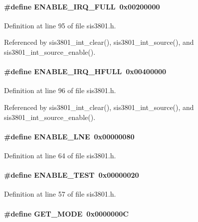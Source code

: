 \paragraph[{ENABLE\_\-IRQ\_\-FULL}]{\setlength{\rightskip}{0pt plus 5cm}\#define ENABLE\_\-IRQ\_\-FULL~0x00200000}\hfill\label{sis3801_8h_aa5d556f1375b6fc908ed0f4977629555}


Definition at line 95 of file sis3801.h.

Referenced by sis3801\_\-int\_\-clear(), sis3801\_\-int\_\-source(), and sis3801\_\-int\_\-source\_\-enable().
\paragraph[{ENABLE\_\-IRQ\_\-HFULL}]{\setlength{\rightskip}{0pt plus 5cm}\#define ENABLE\_\-IRQ\_\-HFULL~0x00400000}\hfill\label{sis3801_8h_a474ca3706b7b452a4e8da40f819b9fc2}


Definition at line 96 of file sis3801.h.

Referenced by sis3801\_\-int\_\-clear(), sis3801\_\-int\_\-source(), and sis3801\_\-int\_\-source\_\-enable().
\paragraph[{ENABLE\_\-LNE}]{\setlength{\rightskip}{0pt plus 5cm}\#define ENABLE\_\-LNE~0x00000080}\hfill\label{sis3801_8h_acc7e4f0a1a6419d0a132a8a1ea7fadc2}


Definition at line 64 of file sis3801.h.
\paragraph[{ENABLE\_\-TEST}]{\setlength{\rightskip}{0pt plus 5cm}\#define ENABLE\_\-TEST~0x00000020}\hfill\label{sis3801_8h_a99e2a293479706a4778c6f9c879c4803}


Definition at line 57 of file sis3801.h.
\paragraph[{GET\_\-MODE}]{\setlength{\rightskip}{0pt plus 5cm}\#define GET\_\-MODE~0x0000000C}\hfill\label{sis3801_8h_a88b365739b031effedb7c30b2c7a7ef2}


